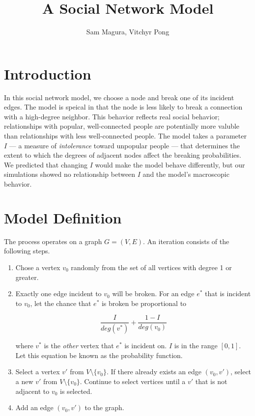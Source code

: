 \documentclass[a4paper,10pt]{article}
\title{A Social Network Model}
\author{Sam Magura, Vitchyr Pong}
\begin{document}
\maketitle

\section{Introduction}

In this social network model, we choose a node and break one of its incident edges. The model is speical in that the node is less likely to break a connection with a high-degree neighbor. This behavior reflects real social behavior; relationships with popular, well-connected people are potentially more valuble than relationships with less well-connected people. The model takes a parameter $I$ --- a measure of \emph{intolerance} toward unpopular people --- that determines the extent to which the degrees of adjacent nodes affect the breaking probabilities. We predicted that changing $I$ would make the model behave differently, but our simulations showed no relationship between $I$ and the model's macroscopic behavior. 

\section{Model Definition}

The process operates on a graph $G = (V, E)$. An iteration consists of the following steps. 

\begin{enumerate}
 \item Chose a vertex $v_0$ randomly from the set of all vertices with degree 1 or greater. 
 \item Exactly one edge incident to $v_0$ will be broken. For an edge $e^*$ that is incident to $v_0$, let the chance that $e^*$ is broken be proportional to

 \begin{equation}
\label{eqn:pr-function}
  \frac{I}{deg(v^*)} + \frac{1 - I}{deg(v_0)}
 \end{equation}

where $v^*$ is the \emph{other} vertex that $e^*$ is incident on. $I$ is in the range $[0, 1]$. Let this equation be known as the probability function. 

 \item Select a vertex $v'$ from $V \setminus \{v_0\}$. If there already exists an edge $(v_0, v')$, select a new $v'$ from $V \setminus \{v_0\}$. Continue to select vertices until a $v'$ that is not adjacent to $v_0$ is selected.

 \item Add an edge $(v_0, v')$ to the graph. 

\end{enumerate}
\end{document}
